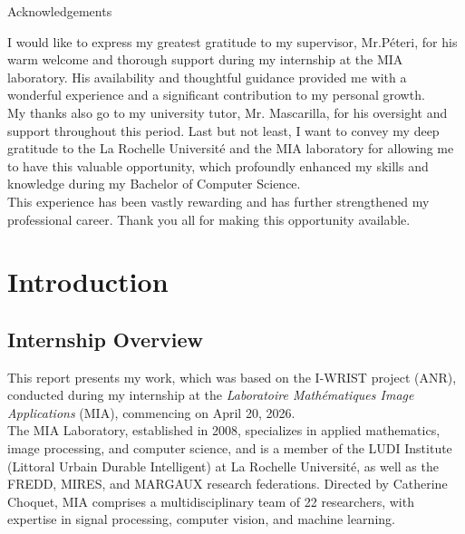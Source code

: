 \documentclass{article}
\begin{document}
\thispagestyle{empty}

\newpage
\vspace*{2cm}
\begin{center}
    {\LARGE Acknowledgements}
\end{center}
\vspace{1cm}
    
I would like to express my greatest gratitude to my supervisor, Mr.Péteri, for his warm welcome and thorough support during my internship at the MIA laboratory. His availability and thoughtful guidance provided me with a wonderful experience and a significant contribution to my personal growth.\\

My thanks also go to my university tutor, Mr. Mascarilla, for his oversight and support throughout this period. Last but not least, I want to convey my deep gratitude to the La Rochelle Université and the MIA laboratory for allowing me to have this valuable opportunity, which profoundly enhanced my skills and knowledge during my Bachelor of Computer Science.\\

This experience has been vastly rewarding and has further strengthened my professional career. Thank you all for making this opportunity available. 


\newpage
\tableofcontents

\newpage
\section{Introduction} %
\setcounter{page}{1}

\subsection{Internship Overview}
This report presents my work, which was based on the I-WRIST project (ANR), conducted during my internship at the \textit{Laboratoire Mathématiques Image Applications} (MIA), commencing on April 20, 2026. \\

The MIA Laboratory, established in 2008, specializes in applied mathematics, image processing, and computer science, and is a member of the LUDI Institute (Littoral Urbain Durable Intelligent) at La Rochelle Université, as well as the FREDD, MIRES, and MARGAUX research federations. Directed by Catherine Choquet, MIA comprises a multidisciplinary team of 22 researchers, with expertise in signal processing, computer vision, and machine learning.\\
\end{document}
